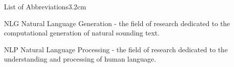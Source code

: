 \begin{mclistof}{List of Abbreviations}{3.2cm}

\item[NLG] Natural Language Generation - the field of research dedicated to the computational generation of natural sounding text.

\item[NLP] Natural Language Processing - the field of research dedicated to the understanding and processing of human language.



\end{mclistof} 
